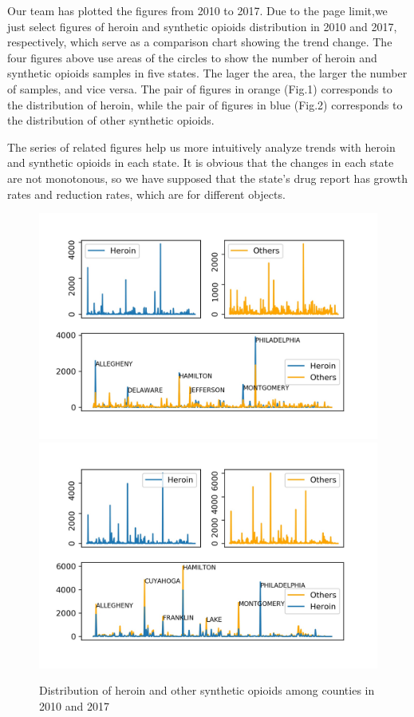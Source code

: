\documentclass[12pt]{article}
\begin{document}
Our team has plotted the figures from 2010 to 2017. Due to the page limit,we just select figures of heroin and synthetic opioids distribution in 2010 and 2017, respectively, which serve as a comparison chart showing the trend change. The four figures above use areas of the circles to show the number of heroin and synthetic opioids samples in five states. The lager the area, the larger the number of samples, and vice versa. The pair of figures in orange (Fig.1) corresponds to the distribution of heroin, while the pair of figures in blue (Fig.2) corresponds to the distribution of other synthetic opioids.

The series of related figures help us more intuitively analyze trends with heroin and synthetic opioids in each state. It is obvious that the changes in each state are not monotonous, so we have supposed that the state's drug report has growth rates and reduction rates, which are for different objects.



\begin{figure}[!htbp]
\small
\centering
\includegraphics[width=12cm]{Fig/2010_Heroin_and_others(county).jpeg}
\includegraphics[width=12cm]{Fig/2017_Heroin_and_others(county).jpeg}
\caption{Distribution of heroin and other synthetic opioids among counties in 2010 and 2017}
\end{figure}
\end{document}
